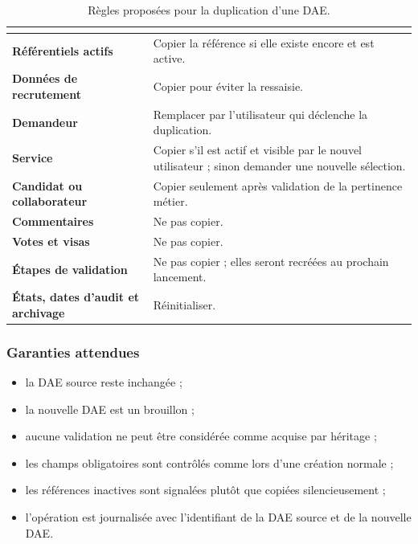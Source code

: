 \begin{table}[htbp]
\centering
\small
\begin{tabularx}{\textwidth}{>{\bfseries}p{}Y}
\toprule
{}
 &  \\
\midrule
Référentiels actifs & Copier la référence si elle existe encore et est active. \\
Données de recrutement & Copier pour éviter la ressaisie. \\
Demandeur & Remplacer par l'utilisateur qui déclenche la duplication. \\
Service & Copier s'il est actif et visible par le nouvel utilisateur ; sinon demander une nouvelle sélection. \\
Candidat ou collaborateur & Copier seulement après validation de la pertinence métier. \\
Commentaires & Ne pas copier. \\
Votes et visas & Ne pas copier. \\
Étapes de validation & Ne pas copier ; elles seront recréées au prochain lancement. \\
États, dates d'audit et archivage & Réinitialiser. \\
\bottomrule
\end{tabularx}
\caption{Règles proposées pour la duplication d'une DAE.}
\label{tab:regles-duplication}
\end{table}

\subsubsection{Garanties attendues}

\begin{itemize}
  \item la DAE source reste inchangée ;
  \item la nouvelle DAE est un brouillon ;
  \item aucune validation ne peut être considérée comme acquise par héritage ;
  \item les champs obligatoires sont contrôlés comme lors d'une création normale ;
  \item les références inactives sont signalées plutôt que copiées silencieusement ;
  \item l'opération est journalisée avec l'identifiant de la DAE source et de la nouvelle DAE.
\end{itemize}

